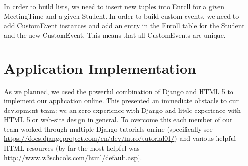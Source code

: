 \documentclass[pdftex,12pt,letter]{article}
\begin{document}
In order to build lists, we need to insert new tuples into Enroll for a given MeetingTime and a given Student.  In order to build custom events, we need to add CustomEvent instances and add an entry in the Enroll table for the Student and the new CustomEvent.  This means that all CustomEvents are unique.

\section{Application Implementation}
As we planned, we used the powerful combination of Django and HTML 5 to implement our application online. This presented an immediate obstacle to our devlopment team: we an zero experience with Django and little experience with HTML 5 or web-site design in general. To overcome this each member of our team worked through multiple Django tutorials online (specifically see \url{https://docs.djangoproject.com/en/dev/intro/tutorial01/}) and various helpful HTML resources (by far the most helpful was \url{http://www.w3schools.com/html/default.asp}).\\
\end{document}
